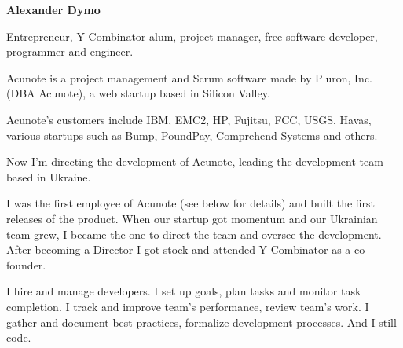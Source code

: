 \documentclass[12pt]{letter}
\begin{document}
{\large\centering\textbf{Alexander Dymo}\\}

\address
{
  \texttt{alex@alexdymo.com} \\
  \url{http://www.alexdymo.com}\\
  \url{http://ua.linkedin.com/in/adymo}\\
  +380\,67\,512\,28\,01 \\
  Mykolayiv, Ukraine \\
}


\begin{llist}

  \vspace{.30in}                %


             Entrepreneur, Y Combinator alum, project manager, free software developer,
             programmer and engineer.



  \startexperience

           \item Acunote is a project management and Scrum software made by Pluron, Inc.
           (DBA Acunote), a web startup based in Silicon Valley.

           \item Acunote's customers include IBM, EMC2, HP, Fujitsu, FCC, USGS, Havas,
           various startups such as Bump, PoundPay, Comprehend Systems and others.

           \item Now I'm directing the development of Acunote, leading the development team based in Ukraine.

           \item I was the first employee of Acunote (see below for details) and built the first releases of the product. When our startup got momentum and our Ukrainian team grew, I became the one to direct the team and oversee the development. After becoming a Director I got stock and attended Y Combinator as a co-founder.

           \item I hire and manage developers. I set up goals, plan tasks and monitor task completion. I track and improve team's performance, review team's work. I gather and document best practices, formalize development processes. And I still code.


\end{llist}
\end{document}

